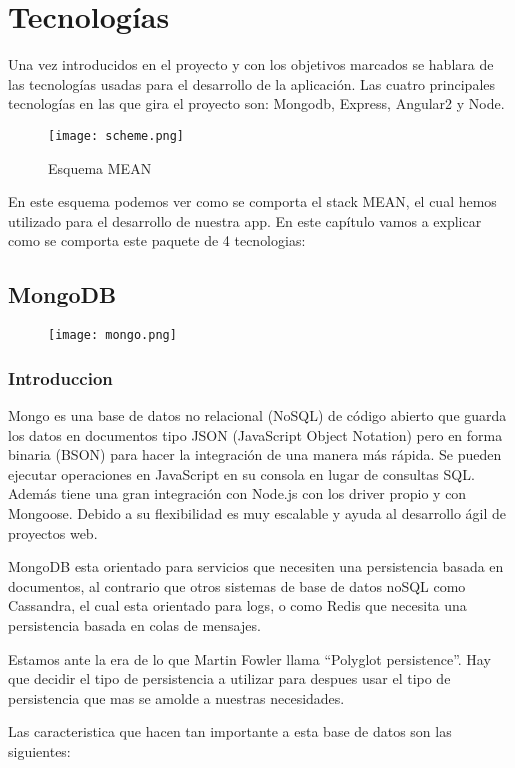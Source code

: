 \chapter{Tecnologías}
Una vez introducidos en el proyecto y con los objetivos marcados se hablara de las tecnologías usadas para el desarrollo de la aplicación. Las cuatro principales tecnologías en las que gira el proyecto son: Mongodb, Express, Angular2 y Node.
\begin{figure}[H]
    \centering
    \texttt{[image: scheme.png]}
    \caption{Esquema MEAN}
\end{figure}
En este esquema podemos ver como se comporta el stack MEAN, el cual hemos utilizado para el desarrollo de nuestra app. En este capítulo vamos a explicar como se comporta este paquete de 4 tecnologias: 


\section{MongoDB}
\begin{figure}[H]
    \centering
    \texttt{[image: mongo.png]}
\end{figure}
\subsection{Introduccion}

Mongo es una base de datos no relacional (NoSQL) de código abierto que guarda los datos en documentos tipo JSON (JavaScript Object Notation) pero en forma binaria (BSON) para hacer la integración de una manera más rápida. Se pueden ejecutar operaciones en JavaScript en su consola en lugar de consultas SQL. Además tiene una gran integración con Node.js con los driver propio y con Mongoose. Debido a su flexibilidad es muy escalable y ayuda al desarrollo ágil de proyectos web.

MongoDB esta orientado para servicios que necesiten una persistencia basada en documentos, al contrario que otros sistemas de base de datos noSQL como Cassandra, el cual esta orientado para logs, o como Redis que necesita una persistencia basada en colas de mensajes.

Estamos ante la era de lo que Martin Fowler llama “Polyglot
persistence”. Hay que decidir el tipo de persistencia a
utilizar para despues usar el tipo de persistencia que mas
se amolde a nuestras necesidades.

Las caracteristica que hacen tan importante a esta base de datos son las siguientes:



